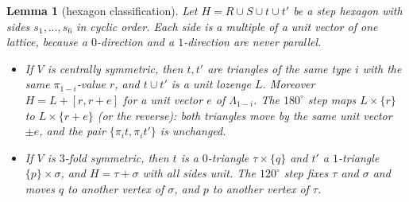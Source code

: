 \documentclass[11pt]{article}
\newtheorem{lemma}[theorem]{Lemma}
\theoremstyle{definition}
\begin{document}
\begin{lemma}[hexagon classification]\label{lem:hex}
Let $H=R\cup S\cup t\cup t'$ be a step hexagon with sides $s_1,\dots,s_6$ in cyclic order. Each side is a multiple of a unit vector of one lattice,
because a $0$-direction and a $1$-direction are never parallel.
\begin{itemize}
\item[(a)] If $V$ is centrally symmetric, then $t,t'$ are triangles \emph{of the same type} $i$ with \emph{the same} $\pi_{1-i}$-value $r$, and
$t\cup t'$ is a unit lozenge $L$. Moreover $H=L+[r,r+e]$ for a unit vector $e$ of $\Lambda_{1-i}$. The $180^\circ$ step maps $L\times\{r\}$
to $L\times\{r+e\}$ (or the reverse): both triangles move by the same unit vector $\pm e$, and the pair $\{\pi_i t,\pi_i t'\}$ is unchanged.
\item[(b)] If $V$ is $3$-fold symmetric, then $t$ is a $0$-triangle $\tau\times\{q\}$ and $t'$ a $1$-triangle $\{p\}\times\sigma$, and
$H=\tau+\sigma$ with all sides unit. The $120^\circ$ step fixes $\tau$ and $\sigma$ and moves $q$ to another vertex of $\sigma$, and $p$ to another vertex of $\tau$.
\end{itemize}
\end{lemma}
\end{document}
